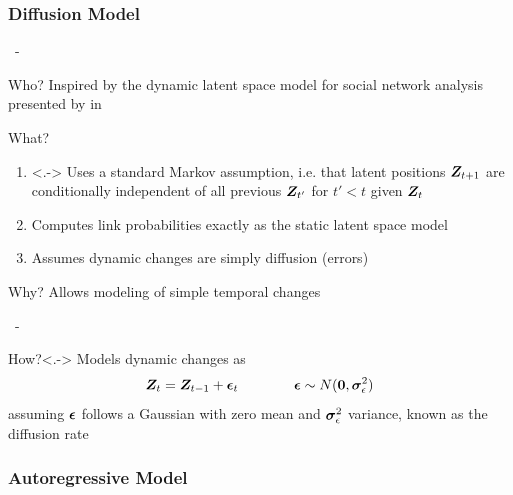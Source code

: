 \documentclass{beamer}
\newenvironment{xframe}
    {\begin{frame}{
        \ifx\insertsubsection\empty
            \strut
        \else\ifx\insertsubsubsection\empty
            \insertsection
        \else
            \insertsection~-~\insertsubsection
        \fi\fi
    }{
        \ifx\insertsubsection\empty
            \insertsection
        \else\ifx\insertsubsubsection\empty
            \insertsubsection
        \else
            \insertsubsubsection
        \fi\fi
    }}
    {\end{frame}}
\newenvironment{xblock}[1]
    {\begin{block}{#1}}
    {\end{block}}
\begin{document}
    \subsubsection{Diffusion Model}
    
    \begin{xframe}
        \begin{xblock}{Who?}
            Inspired by the dynamic latent space model for social network analysis presented by \citeauthor{sarkar2005dynamic} \cite{sarkar2005dynamic} in \citeyear{sarkar2005dynamic}
        \end{xblock}
        
        \begin{xblock}{What?}
            \begin{enumerate}
                \item<.-> Uses a standard Markov assumption, i.e. that latent positions $\bm{Z}_{t+1}$ are conditionally independent of all previous $\bm{Z}_{t'}$ for $t'<t$ given $\bm{Z}_t$
                \item Computes link probabilities exactly as the static latent space model
                \item Assumes dynamic changes are simply diffusion (errors)
            \end{enumerate}
        \end{xblock}
        
        \begin{xblock}{Why?}
            Allows modeling of simple temporal changes
        \end{xblock}
    \end{xframe}
    
    \begin{xframe}
        \begin{xblock}{How?}<.->
            Models dynamic changes as 
            \[\bm{Z}_t = \bm{Z}_{t-1} + \bm{\epsilon}_t \qquad\qquad \bm{\epsilon} \sim N(\bm{0},\bm{\sigma}_\epsilon^2)\]
            \pause
            assuming $\bm{\epsilon}$ follows a Gaussian with zero mean and $\bm{\sigma}_\epsilon^2$ variance, known as the diffusion rate
        \end{xblock}
    \end{xframe}
    
    \subsubsection{Autoregressive Model}
    
\end{document}
